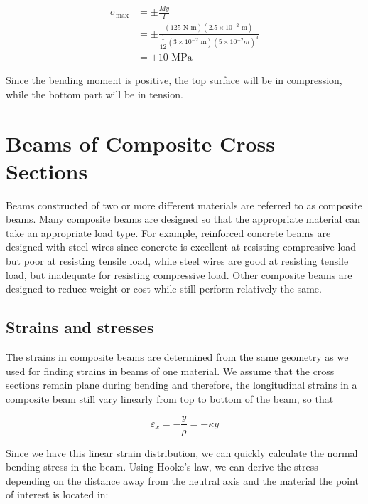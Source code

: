 \documentclass[
fontsize=10pt,
a4paper,
twosides=false,
open=any,
svgnames,
]{kaobook} %
\begin{document}
\begin{example}
  \begin{align*}
    \sigma_{\max} &= \pm \frac{My}{I} \\
                  &= \pm \frac{(125 \text{ N-m})(2.5 \times 10^{-2} \text{ m})}{ \dfrac{1}{12}(3 \times 10^{-2} \text{ m})(5 \times 10^{-2} m)^3} \\
                  &= \pm 10 \text{ MPa}
  \end{align*}
  
Since the bending moment is positive, the top surface will be in compression, while the bottom part will be in tension.
\end{example}

\section{Beams of Composite Cross Sections}

Beams constructed of two or more different materials are referred to as composite beams. Many composite beams are designed so that the appropriate material can take an appropriate load type. For example, reinforced concrete beams are designed with steel wires since concrete is excellent at resisting compressive load but poor at resisting tensile load, while steel wires are good at resisting tensile load, but inadequate for resisting compressive load. Other composite beams are designed to reduce weight or cost while still perform relatively the same.

\subsection{Strains and stresses}

The strains in composite beams are determined from the same geometry as we used for finding strains in beams of one material. We assume that the cross sections remain plane during bending and therefore, the longitudinal strains in a composite beam still vary linearly from top to bottom of the beam, so that

\begin{equation}
  {\varepsilon _x} =  - \frac{y}{\rho } =  - \kappa y
\end{equation}

Since we have this linear strain distribution, we can quickly calculate the normal bending stress in the beam. Using Hooke’s law, we can derive the stress depending on the distance away from the neutral axis and the material the point of interest is located in:
\end{document}

